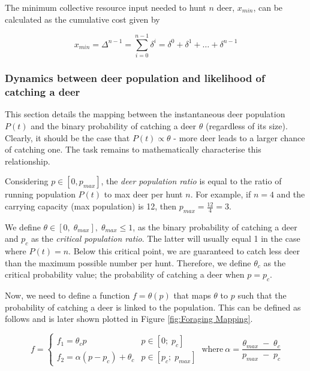 The minimum collective resource input needed to hunt $n$ deer, $x_{min}$, can be calculated as the cumulative cost given by

\begin{equation}
x_{min} = \Delta^{n-1} = \sum_{i=0}^{n-1}\delta^i = \delta^0 + \delta^1 + \dots + \delta^{n-1}
\end{equation}

\subsubsection{Dynamics between deer population and likelihood of catching a deer}

This section details the mapping between the instantaneous deer population $P(t)$ and the binary probability of catching a deer $\theta$ (regardless of its size). Clearly, it should be the case that $P(t) \propto \theta$ - more deer leads to a larger chance of catching one. The task remains to mathematically characterise this relationship. 

Considering $p \in [0,  p_{max}]$, the \textit{deer population ratio} is equal to the ratio of running population $P(t)$ to max deer per hunt $n$. For example, if $n=4$ and the carrying capacity (max population) is 12, then $p_{max} = \frac{12}{4} = 3$. 

We define $\theta \in [0, \; \theta_{max}], \; \theta_{max} \leq 1 $, as the binary probability of catching a deer and $p_c$ as the \textit{critical population ratio}. The latter will usually equal 1 in the case where $P(t) = n$. Below this critical point, we are guaranteed to catch less deer than the maximum possible number per hunt. Therefore, we define $\theta_c$ as the critical probability value; the probability of catching a deer when $p=p_c$.

Now, we need to define a function $f = \theta(p)$ that maps $\theta$ to $p$ such that the probability of catching a deer is linked to the population. This can be defined as follows and is later shown plotted in Figure \ref{fig:Foraging Mapping}.\newline

\begin{equation}
f=\begin{cases} 
      f_1 = \theta_c p & p \in [0; \; p_c] \\
      f_2 = \alpha(p-p_c) + \theta_c & p \in [p_c; \; p_{max}]
\end{cases}
\ \text{where} \ \alpha = \frac{\theta_{max}\; - \; \theta_c}{p_{max} \; - \; p_c}
\end{equation}
\newline

